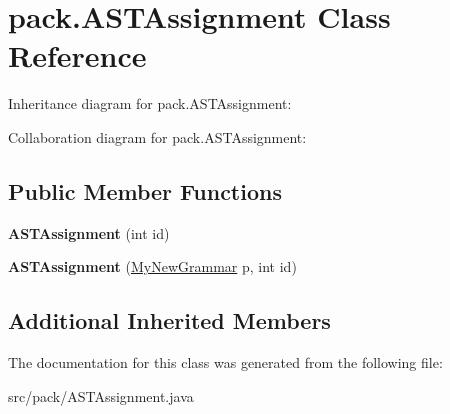 \hypertarget{classpack_1_1_a_s_t_assignment}{}\section{pack.\+A\+S\+T\+Assignment Class Reference}
\label{classpack_1_1_a_s_t_assignment}


Inheritance diagram for pack.\+A\+S\+T\+Assignment\+:


Collaboration diagram for pack.\+A\+S\+T\+Assignment\+:
\subsection*{Public Member Functions}
\begin{DoxyCompactItemize}
\item 
{\bfseries A\+S\+T\+Assignment} (int id)\hypertarget{classpack_1_1_a_s_t_assignment_a6367bb165cd9a656476d020fb36421b4}{}\label{classpack_1_1_a_s_t_assignment_a6367bb165cd9a656476d020fb36421b4}

\item 
{\bfseries A\+S\+T\+Assignment} (\hyperlink{classpack_1_1_my_new_grammar}{My\+New\+Grammar} p, int id)\hypertarget{classpack_1_1_a_s_t_assignment_a19e0789c9aadd0cc3b62158bc22ed11c}{}\label{classpack_1_1_a_s_t_assignment_a19e0789c9aadd0cc3b62158bc22ed11c}

\end{DoxyCompactItemize}
\subsection*{Additional Inherited Members}


The documentation for this class was generated from the following file\+:\begin{DoxyCompactItemize}
\item 
src/pack/A\+S\+T\+Assignment.\+java\end{DoxyCompactItemize}
